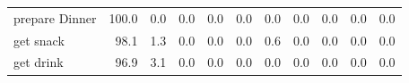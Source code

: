 \begin{tabular}{lrrrrrrrrrr}
prepare Dinner    &       100.0 &                0.0 &               0.0 &                0.0 &                0.0 &              0.0 &                      0.0 &                   0.0 &              0.0 &              0.0 \\
get snack         &        98.1 &                1.3 &               0.0 &                0.0 &                0.0 &              0.6 &                      0.0 &                   0.0 &              0.0 &              0.0 \\
get drink         &        96.9 &                3.1 &               0.0 &                0.0 &                0.0 &              0.0 &                      0.0 &                   0.0 &              0.0 &              0.0 \\
\bottomrule
\end{tabular}

%
%

